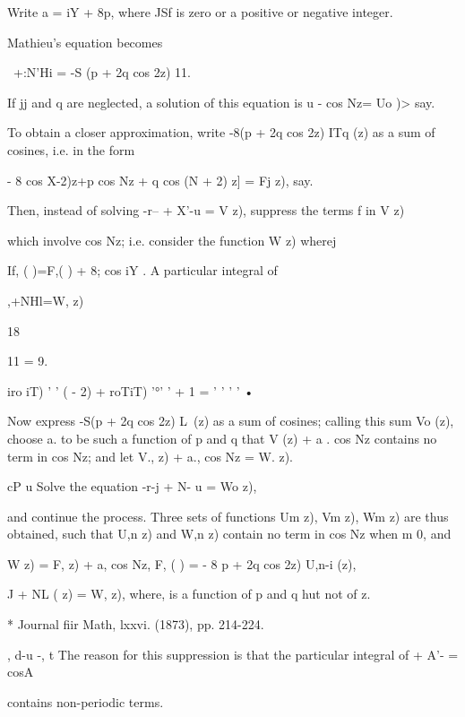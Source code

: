 Write a = iY + 8p, where JSf is zero or a positive or negative
integer.

Mathieu's equation becomes

 \ +:N'Hi = -S (p + 2q cos 2z) 11.

If jj and q are neglected, a solution of this equation is u - cos Nz=
Uo )> say.

To obtain a closer approximation, write -8(p + 2q cos 2z) ITq (z) as a
sum of cosines, i.e. in the form

- 8 cos X-2)z+p cos Nz + q cos (N + 2) z] = Fj z), say.

Then, instead of solving -r-- + X'-u = V z), suppress the terms f in V
z)

which involve cos Nz; i.e. consider the function W z) wherej

If, ( )=F,( ) + 8; cos iY . A particular integral of

,+NHl=W, z)

18

11 = 9.

iro iT) ' ' ( - 2) + roTiT) '°' ' + 1 = ' ' ' ' •

Now express -S(p + 2q cos 2z) L\ (z) as a sum of cosines; calling
this sum Vo (z), choose a. to be such a function of p and q that V (z)
+ a . cos Nz contains no term in cos Nz; and let V., z) + a., cos Nz
= W. z).

cP u Solve the equation -r-j + N- u = Wo z),

and continue the process. Three sets of functions Um z), Vm z), Wm z)
are thus obtained, such that U,n z) and W,n z) contain no term in cos
Nz when m 0, and

W z) = F, z) + a, cos Nz, F, ( ) = - 8 p + 2q cos 2z) U,n-i (z),

 J + NL ( z) = W, z), where, is a function of p and q hut not of z.

* Journal fiir Math, lxxvi. (1873), pp. 214-224.

, d-u -, t The reason for this suppression is that the particular
integral of + A'- = cosA

contains non-periodic terms.

